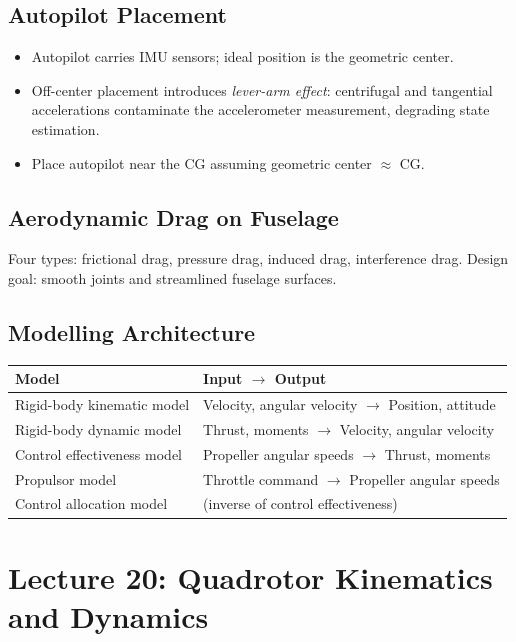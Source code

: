 \documentclass[11pt,a4paper]{article}
\begin{document}
\subsection{Autopilot Placement}

\begin{itemize}
  \item Autopilot carries IMU sensors; ideal position is the geometric center.
  \item Off-center placement introduces \emph{lever-arm effect}: centrifugal and tangential accelerations contaminate the accelerometer measurement, degrading state estimation.
  \item Place autopilot near the CG assuming geometric center $\approx$ CG.
\end{itemize}

\subsection{Aerodynamic Drag on Fuselage}

Four types: frictional drag, pressure drag, induced drag, interference drag.
Design goal: smooth joints and streamlined fuselage surfaces.

\subsection{Modelling Architecture}

\begin{center}
\begin{tabular}{ll}
\toprule
Model & Input $\to$ Output \\
\midrule
Rigid-body kinematic model & Velocity, angular velocity $\to$ Position, attitude \\
Rigid-body dynamic model & Thrust, moments $\to$ Velocity, angular velocity \\
Control effectiveness model & Propeller angular speeds $\to$ Thrust, moments \\
Propulsor model & Throttle command $\to$ Propeller angular speeds \\
Control allocation model & (inverse of control effectiveness) \\
\bottomrule
\end{tabular}
\end{center}

\newpage
\section{Lecture 20: Quadrotor Kinematics and Dynamics}
\end{document}
